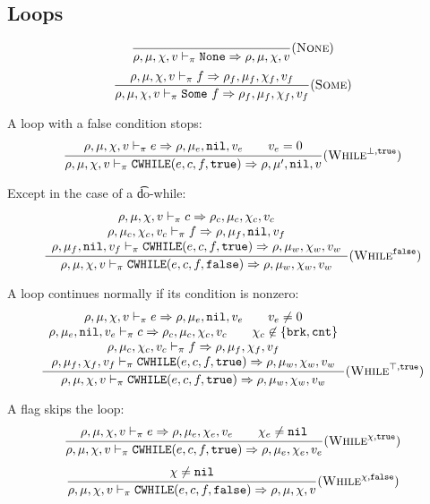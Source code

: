 \subsection{Loops}

\[\dfrac{
}{\rho,\mu,\chi,v \vdash_\pi \texttt{None} \Rightarrow \rho,\mu,\chi,v} (\textsc{None})\]
\[\dfrac{
    \rho,\mu,\chi,v \vdash_\pi f \Rightarrow \rho_f,\mu_f,\chi_f,v_f
}{\rho,\mu,\chi,v \vdash_\pi \texttt{Some}\ f \Rightarrow \rho_f,\mu_f,\chi_f,v_f} (\textsc{Some})\]

A loop with a false condition stops:
\[\dfrac{\begin{array}{c}
    \rho,\mu,\chi,v \vdash_\pi e \Rightarrow \rho,\mu_e,\texttt{nil},v_e \qquad v_e = 0 \\
\end{array}}{\rho,\mu,\chi,v \vdash_\pi \texttt{CWHILE}(e, c, f, \texttt{true}) \Rightarrow \rho,\mu',\texttt{nil},v} (\textsc{While}^{\bot,\texttt{true}})\]

Except in the case of a \t{do-while}:
\[\dfrac{\begin{array}{c}
    \rho,\mu,\chi,v \vdash_\pi c \Rightarrow \rho_c,\mu_c,\chi_c,v_c \\
    \rho,\mu_c,\chi_c,v_c \vdash_\pi f \Rightarrow \rho,\mu_f,\texttt{nil},v_f \\
    \rho,\mu_f,\texttt{nil},v_f \vdash_\pi \texttt{CWHILE}(e, c, f, \texttt{true}) \Rightarrow \rho,\mu_w,\chi_w,v_w
\end{array}}{\rho,\mu,\chi,v \vdash_\pi \texttt{CWHILE}(e, c, f, \texttt{false}) \Rightarrow \rho,\mu_w,\chi_w,v_w} (\textsc{While}^{\texttt{false}})\]

A loop continues normally if its condition is nonzero:
\[\dfrac{\begin{array}{c}
    \rho,\mu,\chi,v \vdash_\pi e \Rightarrow \rho,\mu_e,\texttt{nil},v_e \qquad v_e \ne 0 \\
    \rho,\mu_e,\texttt{nil},v_e \vdash_\pi c \Rightarrow \rho_c,\mu_c,\chi_c,v_c \qquad \chi_c\not\in\{ \texttt{brk}, \texttt{cnt} \} \\
    \rho,\mu_c,\chi_c,v_c \vdash_\pi f \Rightarrow \rho,\mu_f,\chi_f,v_f \\
    \rho,\mu_f,\chi_f,v_f \vdash_\pi \texttt{CWHILE}(e, c, f, \texttt{true}) \Rightarrow \rho,\mu_w,\chi_w,v_w
\end{array}}{\rho,\mu,\chi,v \vdash_\pi \texttt{CWHILE}(e, c, f, \texttt{true}) \Rightarrow \rho,\mu_w,\chi_w,v_w} (\textsc{While}^{\top,\texttt{true}})\]

A flag skips the loop:
\[\dfrac{\begin{array}{c}
    \rho,\mu,\chi,v \vdash_\pi e \Rightarrow \rho,\mu_e,\chi_e,v_e \qquad \chi_e\ne\texttt{nil} \\
\end{array}}{\rho,\mu,\chi,v \vdash_\pi \texttt{CWHILE}(e,c,f,\texttt{true}) \Rightarrow \rho,\mu_e,\chi_e,v_e} (\textsc{While}^{\chi,\texttt{true}})\]
\[\dfrac{\begin{array}{c}
    \chi\ne\texttt{nil}
\end{array}}{\rho,\mu,\chi,v \vdash_\pi \texttt{CWHILE}(e,c,f,\texttt{false}) \Rightarrow \rho,\mu,\chi,v} (\textsc{While}^{\chi,\texttt{false}})\]

